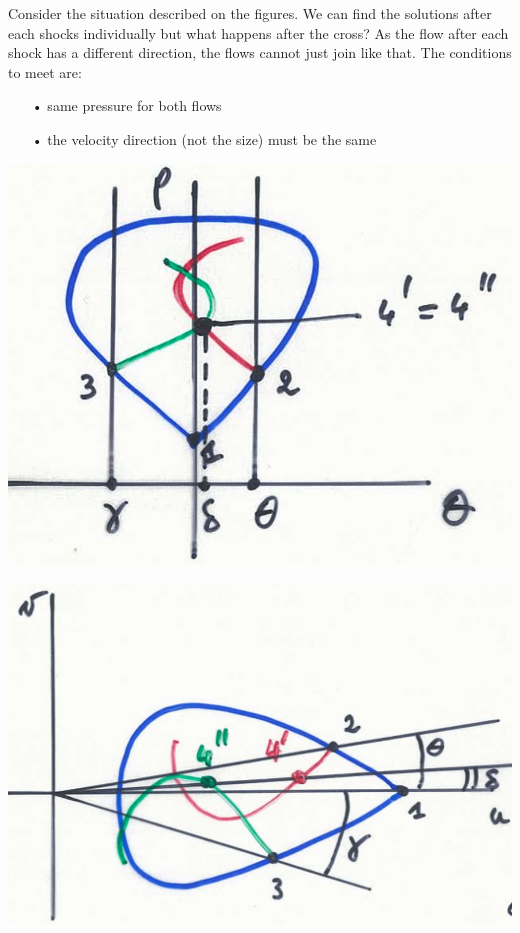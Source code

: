 Consider the situation described on the figures. We can find the solutions after each shocks individually but what happens after the cross? As the flow after each shock has a different direction, the flows cannot just join like that. The conditions to meet are:\\

\begin{itemize}
\item[•] same pressure for both flows
\item[•] the velocity direction (not the size) must be the same\\
\end{itemize}

\begin{center}
\begin{minipage}{0.33\textwidth}
\includegraphics[scale=0.12]{ch9/10}
\end{minipage}
\begin{minipage}{0.35\textwidth}
\includegraphics[scale=0.12]{ch9/11}

\end{minipage}
\end{center}
